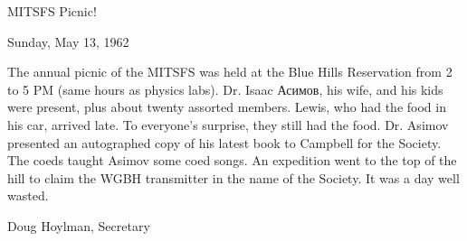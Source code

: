 \documentclass[12pt]{article}
\begin{document}
\begin{center}

MITSFS Picnic!

Sunday, May 13, 1962

\end{center}
 
\vspace{12pt}

\setlength{\parskip}{6pt}

\noindent
The annual picnic of the MITSFS was held at the Blue Hills Reservation from 2 to 5 PM (same hours as physics labs). Dr. Isaac Асимов, his wife, and his kids were present, plus about twenty assorted members. Lewis, who had the food in his car, arrived late. To everyone's surprise, they still had the food. Dr. Asimov presented an autographed copy of his latest book to Campbell for the Society. The coeds taught Asimov some coed songs. An expedition went to the top of the hill to claim the WGBH transmitter in the name of the Society. It was a day well wasted.

\vspace{12pt}

\centerline{Doug Hoylman, Secretary}
\end{document}
